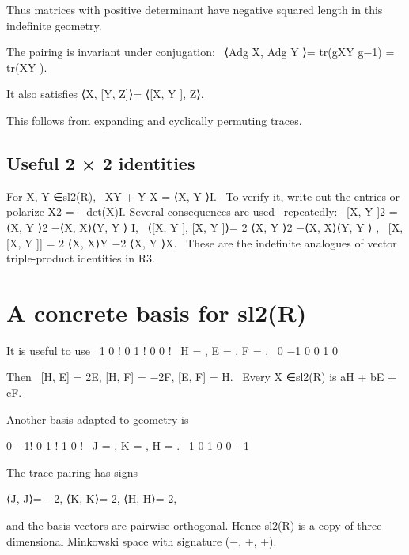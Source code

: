 Thus matrices with positive determinant have negative squared length in this indefinite geometry.


\begin{displaytext}
The pairing is invariant under conjugation: \
⟨Adg X, Adg Y ⟩= tr(gXY g−1) = tr(XY ).
\end{displaytext}

It also satisfies ⟨X, [Y, Z]⟩= ⟨[X, Y ], Z⟩.


This follows from expanding and cyclically permuting traces.


\subsection{Useful 2 × 2 identities}

\begin{displaytext}
For X, Y ∈sl2(R), \
XY + Y X = ⟨X, Y ⟩I. \
To verify it, write out the entries or polarize X2 = −det(X)I. Several consequences are used \
repeatedly: \
[X, Y ]2 = ⟨X, Y ⟩2 −⟨X, X⟩⟨Y, Y ⟩ I, \
⟨[X, Y ], [X, Y ]⟩= 2 ⟨X, Y ⟩2 −⟨X, X⟩⟨Y, Y ⟩ , \
[X, [X, Y ]] = 2 ⟨X, X⟩Y −2 ⟨X, Y ⟩X. \
These are the indefinite analogues of vector triple-product identities in R3.
\end{displaytext}

\section{A concrete basis for sl2(R)}

\begin{displaytext}
It is useful to use \
1 0 ! 0 1 ! 0 0 ! \
H = , E = , F = . \
0 −1 0 0 1 0
\end{displaytext}

\begin{displaytext}
Then \
[H, E] = 2E, [H, F] = −2F, [E, F] = H. \
Every X ∈sl2(R) is aH + bE + cF.
\end{displaytext}

Another basis adapted to geometry is


\begin{displaytext}
0 −1! 0 1 ! 1 0 ! \
J = , K = , H = . \
1 0 1 0 0 −1
\end{displaytext}

The trace pairing has signs


\begin{displaytext}
⟨J, J⟩= −2, ⟨K, K⟩= 2, ⟨H, H⟩= 2,
\end{displaytext}

and the basis vectors are pairwise orthogonal. Hence sl2(R) is a copy of three-dimensional Minkowski space with signature (−, +, +).


